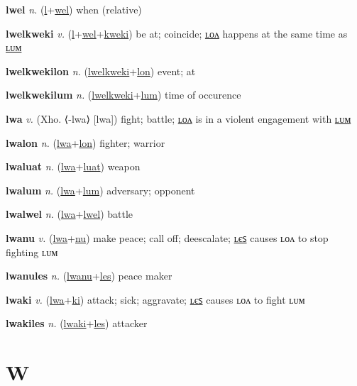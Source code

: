 \textbf{\hypertarget{lwel}{lwel}} \textit{n.} (\hyperlink{l}{l}+\allowbreak \hyperlink{wel}{wel})
when (relative)

\textbf{\hypertarget{lwelkweki}{lwelkweki}} \textit{v.} (\hyperlink{l}{l}+\allowbreak \hyperlink{wel}{wel}+\allowbreak \hyperlink{kweki}{kweki})
be at; coincide; \hyperlink{lwelkwekilon}{ʟᴏᴧ} happens at the same time as \hyperlink{lwelkwekilum}{ʟᴜᴍ}

\textbf{\hypertarget{lwelkwekilon}{lwelkwekilon}} \textit{n.} (\hyperlink{lwelkweki}{lwelkweki}+\allowbreak \hyperlink{lon}{lon})
event; at

\textbf{\hypertarget{lwelkwekilum}{lwelkwekilum}} \textit{n.} (\hyperlink{lwelkweki}{lwelkweki}+\allowbreak \hyperlink{lum}{lum})
time of occurence

\textbf{\hypertarget{lwa}{lwa}} \textit{v.} (Xho. ⟨-lwa⟩ [lwa])
fight; battle; \hyperlink{lwalon}{ʟᴏᴧ} is in a violent engagement with \hyperlink{lwalum}{ʟᴜᴍ}

\textbf{\hypertarget{lwalon}{lwalon}} \textit{n.} (\hyperlink{lwa}{lwa}+\allowbreak \hyperlink{lon}{lon})
fighter; warrior

\textbf{\hypertarget{lwaluat}{lwaluat}} \textit{n.} (\hyperlink{lwa}{lwa}+\allowbreak \hyperlink{luat}{luat})
weapon

\textbf{\hypertarget{lwalum}{lwalum}} \textit{n.} (\hyperlink{lwa}{lwa}+\allowbreak \hyperlink{lum}{lum})
adversary; opponent

\textbf{\hypertarget{lwalwel}{lwalwel}} \textit{n.} (\hyperlink{lwa}{lwa}+\allowbreak \hyperlink{lwel}{lwel})
battle

\textbf{\hypertarget{lwanu}{lwanu}} \textit{v.} (\hyperlink{lwa}{lwa}+\allowbreak \hyperlink{nu}{nu})
make peace; call off; deescalate; \hyperlink{lwanules}{ʟєꜱ} causes ʟᴏᴧ to stop fighting ʟᴜᴍ

\textbf{\hypertarget{lwanules}{lwanules}} \textit{n.} (\hyperlink{lwanu}{lwanu}+\allowbreak \hyperlink{les}{les})
peace maker

\textbf{\hypertarget{lwaki}{lwaki}} \textit{v.} (\hyperlink{lwa}{lwa}+\allowbreak \hyperlink{ki}{ki})
attack; sick; aggravate; \hyperlink{lwakiles}{ʟєꜱ} causes ʟᴏᴧ to fight ʟᴜᴍ

\textbf{\hypertarget{lwakiles}{lwakiles}} \textit{n.} (\hyperlink{lwaki}{lwaki}+\allowbreak \hyperlink{les}{les})
attacker

\section{W}

